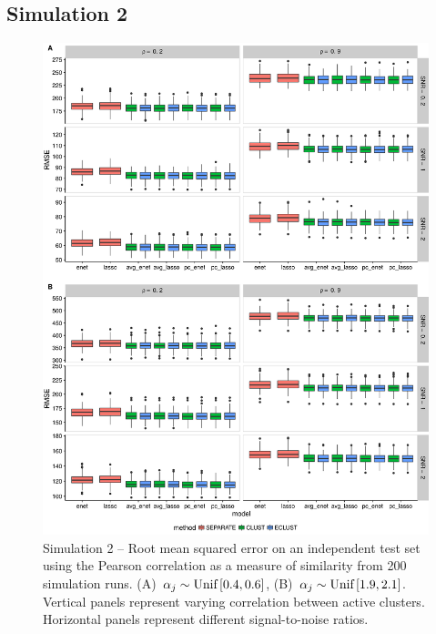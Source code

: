 \begin{appendices}
\subsection*{Simulation 2}
\begin{figure}[h]
	\centering
	\includegraphics[scale=0.55, keepaspectratio]{./figs/hydra/results/figures/sim2-sept8/RMSE_Correlation_sim2.png}
	\caption{Simulation 2 -- Root mean squared error on an independent test set using the Pearson correlation as a measure of similarity from 200 simulation runs. \mbox{(A) $\alpha_{j} \sim \textrm{{Unif}}\left[0.4, 0.6\right]$}, \mbox{(B) $\alpha_{j} \sim \textrm{{Unif}}\left[1.9, 2.1\right]$}. Vertical panels represent varying correlation between active clusters. Horizontal panels represent different signal-to-noise ratios.}
	\label{fig:RMSE_Correlation_sim2}
\end{figure}


\end{appendices}
